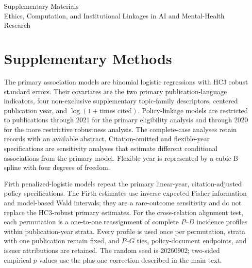 \documentclass[11pt]{article}
\begin{document}
\begin{center}
{\Large Supplementary Materials}\\[0.5em]
{\large Ethics, Computation, and Institutional Linkages in AI and Mental-Health Research}
\end{center}

\section*{Supplementary Methods}
The primary association models are binomial logistic regressions with HC3 robust standard errors. Their covariates are the two primary publication-language indicators, four non-exclusive supplementary topic-family descriptors, centered publication year, and $\log(1+\text{times cited})$. Policy-linkage models are restricted to publications through 2021 for the primary eligibility analysis and through 2020 for the more restrictive robustness analysis. The complete-case analyses retain records with an available abstract. Citation-omitted and flexible-year specifications are sensitivity analyses that estimate different conditional associations from the primary model. Flexible year is represented by a cubic B-spline with four degrees of freedom.

Firth penalized-logistic models repeat the primary linear-year, citation-adjusted policy specifications. The Firth estimates use inverse expected Fisher information and model-based Wald intervals; they are a rare-outcome sensitivity and do not replace the HC3-robust primary estimates. For the cross-relation alignment test, each permutation is a one-to-one reassignment of complete $P$--$D$ incidence profiles within publication-year strata. Every profile is used once per permutation, strata with one publication remain fixed, and $P$--$G$ ties, policy-document endpoints, and issuer attributions are retained. The random seed is 20260902; two-sided empirical $p$ values use the plus-one correction described in the main text.
\end{document}
